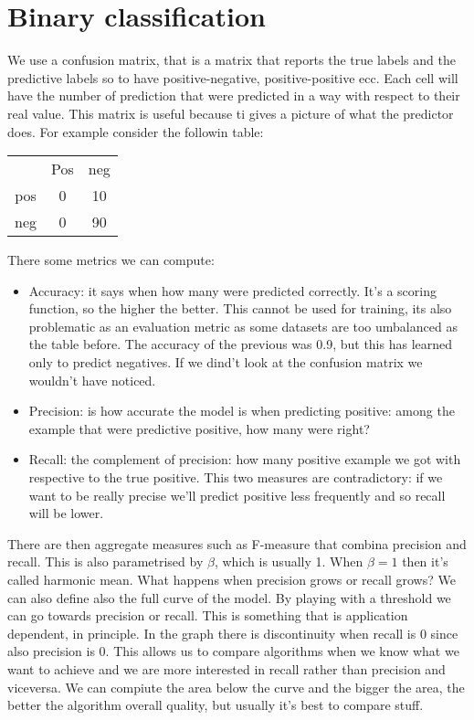 \section{Binary classification}
We use a confusion matrix, that is a matrix that reports the true labels and the predictive labels so to have positive-negative, positive-positive ecc. \newline
Each cell will have the number of prediction that were predicted in a way with respect to their real value.\newline
This matrix is useful because ti gives a picture of what the predictor does. For example consider the followin table:
\begin{center}
	\begin{tabular}{ccc}
	& Pos&neg\\
	pos& 0 &10\\
	neg& 0 &90
	\end{tabular}
\end{center}
There some metrics we can compute:
\begin{itemize}
	\item Accuracy: it says when how many were predicted correctly. It's a scoring function, so the higher the better. This cannot be used for training, its also problematic as an evaluation metric as some datasets are too umbalanced as the table before. The accuracy of the previous was 0.9, but this has learned only to predict negatives. If we dind't look at the confusion matrix we wouldn't have noticed. 
	\item Precision: is how accurate the model is when predicting positive: among the example that were predictive positive, how many were right? 
	\item Recall: the complement of precision: how many positive example we got with respective to the true positive. This two measures are contradictory: if we want to be really precise we'll predict positive less frequently and so recall will be lower.
\end{itemize}
There are then aggregate measures such as F-measure that combina precision and recall. This is also parametrised by $\beta$, which is usually 1. When $\beta=1$ then it's called harmonic mean. What happens when precision grows or recall grows?\newline
We can also define also the full curve of the model. By playing with a threshold we can go towards precision or recall. This is something that is application dependent, in principle. In the graph there is discontinuity when recall is 0 since also precision is 0. This allows us to compare algorithms when we know what we want to achieve and we are more interested in recall rather than precision and viceversa. We can compiute the area below the curve and the bigger the area, the better the algorithm overall quality, but usually it's best to compare stuff.
